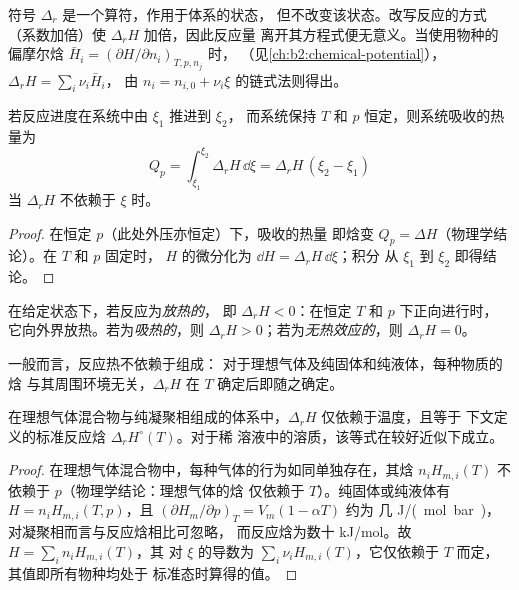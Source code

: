 \begin{remark}[导数，而非差值]\label{rem:b2:reaction-enthalpy:operator}
符号 $\Delta_r$ 是一个算符，作用于体系的状态，
但不改变该状态。改写反应的方式
（系数加倍）使 $\Delta_r H$ 加倍，因此反应量
离开其方程式便无意义。当使用物种的偏摩尔焓
$\bar H_i = (\partial H/\partial n_i)_{T,p,n_j}$ 时，
（见\cref{ch:b2:chemical-potential}），$\Delta_r H = \sum_i\nu_i\bar H_i$，
由 $n_i = n_{i,0} + \nu_i\xi$ 的链式法则得出。
\end{remark}

\begin{proposition}[定温定压下吸收的热量]\label{prop:b2:reaction-enthalpy:qp}
若反应进度在系统中由 $\xi_1$ 推进到 $\xi_2$，
而系统保持 $T$ 和 $p$ 恒定，则系统吸收的热量为
\[
  Q_p = \int_{\xi_1}^{\xi_2}\Delta_r H\,\dd\xi = \Delta_r H\,(\xi_2 - \xi_1)
\]
当 $\Delta_r H$ 不依赖于 $\xi$ 时。
\end{proposition}

\begin{proof}
在恒定 $p$（此处外压亦恒定）下，吸收的热量
即焓变 $Q_p = \Delta H$（物理学结论）。在 $T$ 和 $p$ 固定时，
$H$ 的微分化为 $\dd H = \Delta_r H\,\dd\xi$；积分
从 $\xi_1$ 到 $\xi_2$ 即得结论。
\end{proof}

\begin{definition}\label{def:b2:reaction-enthalpy:exothermic}
在给定状态下，若反应为\emph{放热的}，
即 $\Delta_r H < 0$：在恒定 $T$ 和 $p$ 下正向进行时，
它向外界放热。若为\emph{吸热的}，则 $\Delta_r H >
0$；若为\emph{无热效应的}，则 $\Delta_r H = 0$。
\end{definition}

一般而言，反应热不依赖于组成：
对于理想气体及纯固体和纯液体，每种物质的焓
与其周围环境无关，$\Delta_r H$ 在
$T$ 确定后即随之确定。

\begin{proposition}[理想系统]\label{prop:b2:reaction-enthalpy:ideal}
在理想气体混合物与纯凝聚相组成的体系中，$\Delta_r H$
仅依赖于温度，且等于
下文定义的标准反应焓 $\Delta_r H^\circ(T)$。对于稀
溶液中的溶质，该等式在较好近似下成立。
\end{proposition}

\begin{proof}
在理想气体混合物中，每种气体的行为如同单独存在，其焓
$n_iH_{m,i}(T)$ 不依赖于 $p$（物理学结论：理想气体的焓
仅依赖于 $T$）。纯固体或纯液体有 $H = n_iH_{m,i}(T,
p)$，且 $(\partial H_m/\partial p)_T = V_m(1 - \alpha T)$ 约为
几 \unit{J/(mol.bar)}，对凝聚相而言与反应焓相比可忽略，
而反应焓为数十 \unit{kJ/mol}。故 $H = \sum_in_iH_{m,i}(T)$，其
对 $\xi$ 的导数为 $\sum_i\nu_iH_{m,i}(T)$，它仅依赖于
$T$ 而定，其值即所有物种均处于
标准态时算得的值。
\end{proof}

